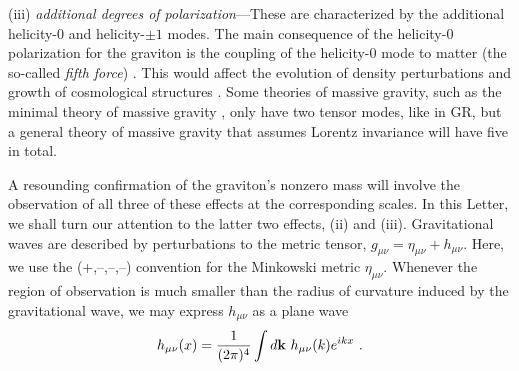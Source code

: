 \documentclass[prd,twocolumn,aps,psfig,nofootinbib,nobibnotes,superscriptaddress,preprintnumbers,times]{revtex4-2}
\begin{document}
(iii) \textit{additional degrees of polarization}---These are characterized by the additional helicity-$0$ and helicity-$\pm 1$ modes. The main consequence of the helicity-$0$ polarization for the graviton is the coupling of the helicity-0 mode to matter (the so-called {\it fifth force}) \cite{deRham:2014naa}. This would affect the evolution of density perturbations and growth of cosmological structures \cite{Sipp:2022kmb}.  Some theories of massive gravity, such as the minimal theory of massive gravity \cite{DeFelice:2015hla}, only have two tensor modes, like in GR, but a general theory of massive gravity that assumes Lorentz invariance will have five in total.

A resounding confirmation of the graviton's nonzero mass will involve the observation of all three of these effects at the corresponding scales. In this Letter, we shall turn our attention to the latter two effects, (ii) and (iii). Gravitational waves are described by perturbations to the
metric tensor, $g_{\mu\nu} = \eta_{\mu\nu} + h_{\mu\nu}$. Here, we use the (+,--,--,--) convention for the Minkowski metric $\eta_{\mu\nu}$. Whenever the region of observation is much smaller than the radius of curvature induced by the gravitational wave, we may express $h_{\mu\nu}$ as a plane wave \cite{Isi:2018miq}
\begin{equation}\label{eqn:planewave}
    h_{\mu\nu}(x) = \frac{1}{(2\pi)^4}\int d{\bf k} \ h_{\mu\nu}(k) e^{ikx} \ .
\end{equation}
\end{document}
